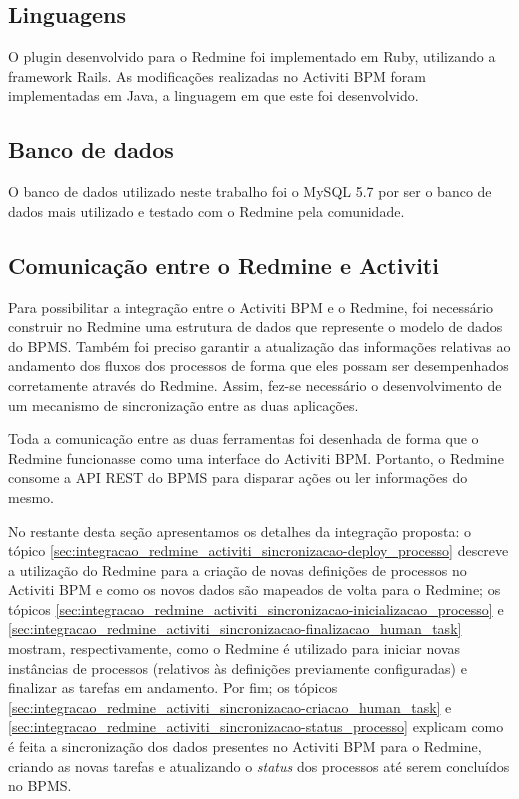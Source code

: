 \subsection{Linguagens}\label{sec:integracao_redmine_activiti_implementacao_detalhes_desenvolvimento_linguagens}

O plugin desenvolvido para o Redmine foi implementado em Ruby\cite{ruby-lang}, utilizando a framework Rails\cite{rails}.
As modificações realizadas no Activiti BPM foram implementadas em Java, a linguagem em que este foi desenvolvido.

\subsection{Banco de dados}\label{sec:integracao_redmine_activiti_implementacao__bd}

O banco de dados utilizado neste trabalho foi o MySQL 5.7 por ser o banco de dados mais utilizado e testado com o Redmine pela comunidade.

\subsection{Comunicação entre o Redmine e Activiti}\label{sec:integracao_redmine_activiti_implementacao_sincronizacao}

Para possibilitar a integração entre o Activiti BPM e o Redmine, foi necessário construir no Redmine uma estrutura de dados que represente o modelo de dados do BPMS. Também foi preciso garantir a atualização das informações relativas ao andamento dos fluxos dos processos de forma que eles possam ser desempenhados corretamente através do Redmine. Assim, fez-se necessário o desenvolvimento de um mecanismo de sincronização entre as duas aplicações.

Toda a comunicação entre as duas ferramentas foi desenhada de forma que o Redmine funcionasse como uma interface do Activiti BPM. Portanto, o Redmine consome a API REST do BPMS para disparar ações ou ler informações do mesmo.

No restante desta seção apresentamos os detalhes da integração proposta: o tópico \ref{sec:integracao_redmine_activiti_sincronizacao-deploy_processo} descreve a utilização do Redmine para  a criação de novas definições de processos no Activiti BPM e como os novos dados são mapeados de volta para o Redmine; os tópicos \ref{sec:integracao_redmine_activiti_sincronizacao-inicializacao_processo} e \ref{sec:integracao_redmine_activiti_sincronizacao-finalizacao_human_task} mostram, respectivamente, como o Redmine é utilizado para iniciar novas instâncias de processos (relativos às definições previamente configuradas) e finalizar as tarefas em andamento. Por fim; os tópicos \ref{sec:integracao_redmine_activiti_sincronizacao-criacao_human_task} e \ref{sec:integracao_redmine_activiti_sincronizacao-status_processo} explicam como é feita a sincronização dos dados presentes no Activiti BPM para o Redmine, criando as novas tarefas e atualizando o \textit{status} dos processos até serem concluídos no BPMS.

